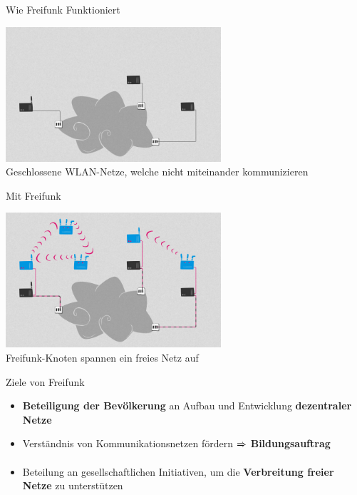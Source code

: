 \documentclass[t]{beamer}
\begin{document}
  \begin{frame}{Wie Freifunk Funktioniert}
    \begin{center}
      \includegraphics[height=5cm]{images/network_1}\\
      \vspace{1em}
      Geschlossene WLAN-Netze, welche nicht miteinander kommunizieren
      \vspace{1em}
    \end{center}
  \end{frame}

  \begin{frame}{Mit Freifunk}
    \begin{center}
      \includegraphics[height=5cm]{images/network_4}\\
      \vspace{1em}
      Freifunk-Knoten spannen ein freies Netz auf
      \vspace{1em}
    \end{center}
  \end{frame}

  \begin{frame}{Ziele von Freifunk}
    \begin{itemize}
      \item \textbf{Beteiligung der Bevölkerung} an Aufbau und Entwicklung \textbf{dezentraler Netze}
      \item Verständnis von Kommunikationsnetzen fördern $\xRightarrow{}$ \textbf{Bildungsauftrag}
      \item Beteilung an gesellschaftlichen Initiativen, um die \textbf{Verbreitung freier Netze} zu unterstützen
    \end{itemize}
  \end{frame}
\end{document}
